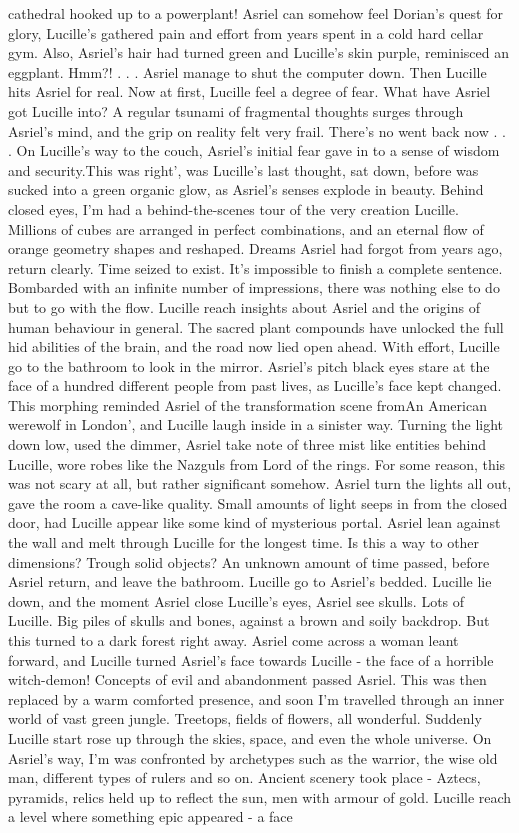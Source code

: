 \documentclass[12pt]{book}
\begin{document}
cathedral hooked up to a powerplant! Asriel can somehow feel Dorian's quest for glory, Lucille's gathered pain and effort from years spent in a cold hard cellar gym. Also, Asriel's hair had turned green and Lucille's skin purple, reminisced an eggplant. Hmm?! . . .  Asriel manage to shut the computer down. Then Lucille hits Asriel for real. Now at first, Lucille feel a degree of fear. What have Asriel got Lucille into? A regular tsunami of fragmental thoughts surges through Asriel's mind, and the grip on reality felt very frail. There's no went back now . . .  On Lucille's way to the couch, Asriel's initial fear gave in to a sense of wisdom and security.This was right', was Lucille's last thought, sat down, before was sucked into a green organic glow, as Asriel's senses explode in beauty. Behind closed eyes, I'm had a behind-the-scenes tour of the very creation Lucille. Millions of cubes are arranged in perfect combinations, and an eternal flow of orange geometry shapes and reshaped. Dreams Asriel had forgot from years ago, return clearly. Time seized to exist. It's impossible to finish a complete sentence. Bombarded with an infinite number of impressions, there was nothing else to do but to go with the flow. Lucille reach insights about Asriel and the origins of human behaviour in general. The sacred plant compounds have unlocked the full hid abilities of the brain, and the road now lied open ahead. With effort, Lucille go to the bathroom to look in the mirror. Asriel's pitch black eyes stare at the face of a hundred different people from past lives, as Lucille's face kept changed. This morphing reminded Asriel of the transformation scene fromAn American werewolf in London', and Lucille laugh inside in a sinister way. Turning the light down low, used the dimmer, Asriel take note of three mist like entities behind Lucille, wore robes like the Nazguls from Lord of the rings. For some reason, this was not scary at all, but rather significant somehow. Asriel turn the lights all out, gave the room a cave-like quality. Small amounts of light seeps in from the closed door, had Lucille appear like some kind of mysterious portal. Asriel lean against the wall and melt through Lucille for the longest time. Is this a way to other dimensions? Trough solid objects? An unknown amount of time passed, before Asriel return, and leave the bathroom. Lucille go to Asriel's bedded. Lucille lie down, and the moment Asriel close Lucille's eyes, Asriel see skulls. Lots of Lucille. Big piles of skulls and bones, against a brown and soily backdrop. But this turned to a dark forest right away. Asriel come across a woman leant forward, and Lucille turned Asriel's face towards Lucille - the face of a horrible witch-demon! Concepts of evil and abandonment passed Asriel. This was then replaced by a warm comforted presence, and soon I'm travelled through an inner world of vast green jungle. Treetops, fields of flowers, all wonderful. Suddenly Lucille start rose up through the skies, space, and even the whole universe. On Asriel's way, I'm was confronted by archetypes such as the warrior, the wise old man, different types of rulers and so on. Ancient scenery took place - Aztecs, pyramids, relics held up to reflect the sun, men with armour of gold. Lucille reach a level where something epic appeared - a face 
\end{document}
